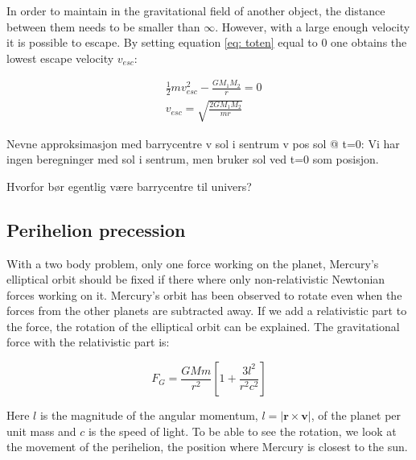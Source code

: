 In order to maintain in the gravitational field of another object, the distance between them needs to be smaller than $ \infty $. However, with a large enough velocity it is possible to escape. By setting  equation \ref{eq: toten} equal to $ 0 $ one obtains the lowest escape velocity $ v_{esc} $: 


\begin{align}
&\frac{1}{2}mv_{esc}^2 - \frac{G	M_1M_2}{r}  = 0\\
& v_{esc} = \sqrt{ \frac{2G	M_1M_2}{mr}}
\end{align}








Nevne approksimasjon med barrycentre v sol i sentrum v pos sol @ t=0:
Vi har ingen beregninger med sol i sentrum, men bruker sol ved t=0 som posisjon. 

Hvorfor bør egentlig være barrycentre til univers?

\subsection{Perihelion precession}

With a two body problem, only one force working on the planet, Mercury's elliptical orbit should be fixed if there where only non-relativistic Newtonian forces working on it. Mercury's orbit has been observed to rotate even when the forces from the other planets are subtracted away. If we add a relativistic part to the force, the rotation of the elliptical orbit can be explained. The gravitational force with the relativistic part is:

\begin{equation}\label{eq:rel_force}
F_G = \frac{GMm}{r^2}\left[ 1 + \frac{3l^2}{r^2c^2}\right]
\end{equation}
	
Here $l$ is the magnitude of the angular momentum, $l = |\textbf{r}\times \textbf{v}|$, of the planet per unit mass and $c$ is the speed of light. To be able to see the rotation, we look at the movement of the perihelion, the position where Mercury is closest to the sun.


